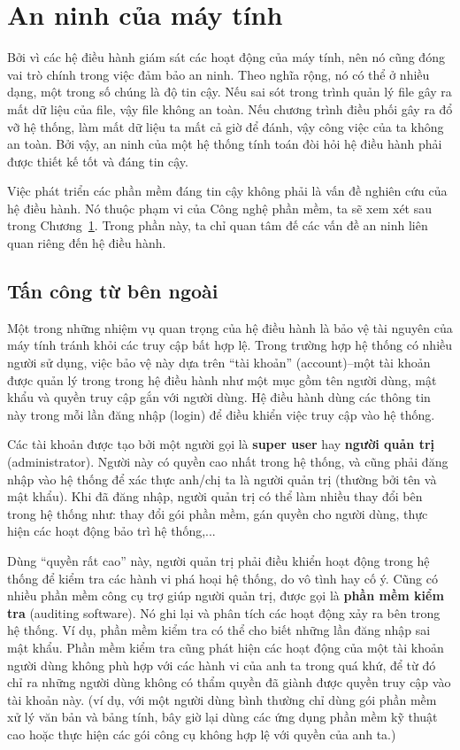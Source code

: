 
\section{An ninh của máy tính}

Bởi vì các hệ điều hành giám sát các hoạt động của máy tính, nên nó cũng đóng vai trò
chính trong việc đảm bảo an ninh. Theo nghĩa rộng, nó có thể ở nhiều dạng, một trong số
chúng là độ tin cậy. Nếu sai sót trong trình quản lý file gây ra mất dữ liệu của file, vậy
file không an toàn. Nếu chương trình điều phối gây ra đổ vỡ hệ thống, làm mất dữ liệu ta
mất cả giờ để đánh, vậy công việc của ta không an toàn. Bởi vậy, an ninh của một hệ
thống tính toán đòi hỏi hệ điều hành phải được thiết kế tốt và đáng tin cậy.

Việc phát triển các phần mềm đáng tin cậy không phải là vấn đề nghiên cứu của hệ điều
hành. Nó thuộc phạm vi của Công nghệ phần mềm, ta sẽ xem xét sau trong
Chương~\ref{}. Trong phần này, ta chỉ quan tâm đế các vấn đề an ninh liên quan riêng đến
hệ điều hành.

\subsection*{Tấn công từ bên ngoài}
Một trong những nhiệm vụ quan trọng của hệ điều hành là bảo vệ tài nguyên của máy tính
tránh khỏi các truy cập bất hợp lệ. Trong trường hợp hệ thống có nhiều người sử dụng, việc
bảo vệ này dựa trên ``tài khoản'' (account)--một tài khoản được quản lý trong trong hệ
điều hành như một mục gồm tên người dùng, mật khẩu và quyền truy cập gắn với người
dùng. Hệ điều hành dùng các thông tin này trong mỗi lần đăng nhập (login) để điều khiển
việc truy cập vào hệ thống.

Các tài khoản được tạo bởi một người gọi là \textbf{super user} hay \textbf{người quản
  trị} (administrator). Người này có quyền cao nhất trong hệ thống, và cũng phải đăng nhập
vào hệ thống để xác thực anh/chị ta là người quản trị (thường bởi tên và mật khẩu). Khi đã
đăng nhập, người quản trị có thể làm nhiều thay đổi bên trong hệ thống như: thay đổi gói
phần mềm, gán quyền cho người dùng, thực hiện các hoạt động bảo trì hệ thống,...

Dùng ``quyền rất cao'' này, người quản trị phải điều khiển hoạt động trong hệ thống để
kiểm tra các hành vi phá hoại hệ thống, do vô tình hay cố ý. Cũng có nhiều phần mềm công
cụ trợ giúp người quản trị, được gọi là \textbf{phần mềm kiểm tra} (auditing software). Nó
ghi lại và phân tích các hoạt động xảy ra bên trong hệ thống. Ví dụ, phần mềm kiểm tra có
thể cho biết những lần đăng nhập sai mật khẩu. Phần mềm kiểm tra cũng phát hiện các hoạt
động của một tài khoản người dùng không phù hợp với các hành vi của anh ta trong quá khứ,
để từ đó chỉ ra những người dùng không có thẩm quyền đã giành được quyền truy cập vào tài
khoản này. (ví dụ, với một người dùng bình thường chỉ dùng gói phần mềm xử lý văn bản và
bảng tính, bây giờ lại dùng các ứng dụng phần mềm kỹ thuật cao hoặc thực hiện các gói công
cụ không hợp lệ với quyền của anh ta.)


